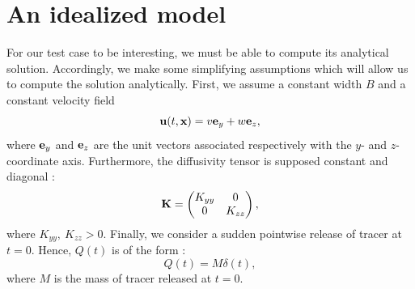 \section{An idealized model}
For our test case to be interesting, we must be able to compute its analytical solution. Accordingly, we make some simplifying assumptions which will allow us to compute the solution analytically.
First, we assume a constant width $B$ and a constant velocity field
\begin{equation} \label{eq:testcase:velocity}
	\mathbf{u}(t,\mathbf{x}) = v \mathbf e_y + w \mathbf e_z,
\end{equation}
where $\mathbf e_y$ and $\mathbf e_z$ are the unit vectors associated respectively with the $y$- and $z$-coordinate axis. Furthermore, the diffusivity tensor is supposed constant and diagonal :
\begin{equation} \label{eq:testcase:diffusivity}
	\mathbf{K} = \begin{pmatrix}
			K_{yy} & 0 \\
			0 & K_{zz}
			\end{pmatrix},
\end{equation}
where $K_{yy},\ K_{zz} > 0$. Finally, we consider a sudden pointwise release of tracer at $t=0$. Hence, $Q(t)$ is of the form :
\begin{equation}
	Q(t) = M\delta(t),
\end{equation} 
where $M$ is the mass of tracer released at $t=0$.

